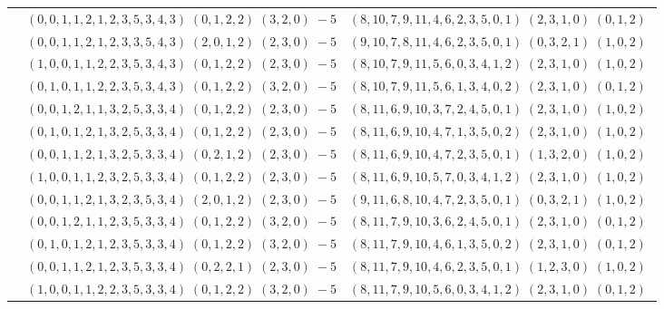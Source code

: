 \documentclass[11pt]{article}
\begin{document}
\begin{longtable}[l]{|c|c|c|}
 \cline{2-3} 
 & $(0 ,0 ,1 ,1 ,2 ,1 ,2 ,3 ,5 ,3 ,4 ,3) \;(0 ,1 ,2 ,2) \;(3 ,2 ,0) \;-5$ & $(8 ,10 ,7 ,9 ,11 ,4 ,6 ,2 ,3 ,5 ,0 ,1) \;(2 ,3 ,1 ,0) \;(0 ,1 ,2) \;$\\ 
 \cline{2-3} 
 & $(0 ,0 ,1 ,1 ,2 ,1 ,2 ,3 ,3 ,5 ,4 ,3) \;(2 ,0 ,1 ,2) \;(2 ,3 ,0) \;-5$ & $(9 ,10 ,7 ,8 ,11 ,4 ,6 ,2 ,3 ,5 ,0 ,1) \;(0 ,3 ,2 ,1) \;(1 ,0 ,2) \;$\\ 
 \cline{2-3} 
 & $(1 ,0 ,0 ,1 ,1 ,2 ,2 ,3 ,5 ,3 ,4 ,3) \;(0 ,1 ,2 ,2) \;(2 ,3 ,0) \;-5$ & $(8 ,10 ,7 ,9 ,11 ,5 ,6 ,0 ,3 ,4 ,1 ,2) \;(2 ,3 ,1 ,0) \;(1 ,0 ,2) \;$\\ 
 \cline{2-3} 
 & $(0 ,1 ,0 ,1 ,1 ,2 ,2 ,3 ,5 ,3 ,4 ,3) \;(0 ,1 ,2 ,2) \;(3 ,2 ,0) \;-5$ & $(8 ,10 ,7 ,9 ,11 ,5 ,6 ,1 ,3 ,4 ,0 ,2) \;(2 ,3 ,1 ,0) \;(0 ,1 ,2) \;$\\ 
 \cline{2-3} 
 & $(0 ,0 ,1 ,2 ,1 ,1 ,3 ,2 ,5 ,3 ,3 ,4) \;(0 ,1 ,2 ,2) \;(2 ,3 ,0) \;-5$ & $(8 ,11 ,6 ,9 ,10 ,3 ,7 ,2 ,4 ,5 ,0 ,1) \;(2 ,3 ,1 ,0) \;(1 ,0 ,2) \;$\\ 
 \cline{2-3} 
 & $(0 ,1 ,0 ,1 ,2 ,1 ,3 ,2 ,5 ,3 ,3 ,4) \;(0 ,1 ,2 ,2) \;(2 ,3 ,0) \;-5$ & $(8 ,11 ,6 ,9 ,10 ,4 ,7 ,1 ,3 ,5 ,0 ,2) \;(2 ,3 ,1 ,0) \;(1 ,0 ,2) \;$\\ 
 \cline{2-3} 
 & $(0 ,0 ,1 ,1 ,2 ,1 ,3 ,2 ,5 ,3 ,3 ,4) \;(0 ,2 ,1 ,2) \;(2 ,3 ,0) \;-5$ & $(8 ,11 ,6 ,9 ,10 ,4 ,7 ,2 ,3 ,5 ,0 ,1) \;(1 ,3 ,2 ,0) \;(1 ,0 ,2) \;$\\ 
 \cline{2-3} 
 & $(1 ,0 ,0 ,1 ,1 ,2 ,3 ,2 ,5 ,3 ,3 ,4) \;(0 ,1 ,2 ,2) \;(2 ,3 ,0) \;-5$ & $(8 ,11 ,6 ,9 ,10 ,5 ,7 ,0 ,3 ,4 ,1 ,2) \;(2 ,3 ,1 ,0) \;(1 ,0 ,2) \;$\\ 
 \cline{2-3} 
 & $(0 ,0 ,1 ,1 ,2 ,1 ,3 ,2 ,3 ,5 ,3 ,4) \;(2 ,0 ,1 ,2) \;(2 ,3 ,0) \;-5$ & $(9 ,11 ,6 ,8 ,10 ,4 ,7 ,2 ,3 ,5 ,0 ,1) \;(0 ,3 ,2 ,1) \;(1 ,0 ,2) \;$\\ 
 \cline{2-3} 
 & $(0 ,0 ,1 ,2 ,1 ,1 ,2 ,3 ,5 ,3 ,3 ,4) \;(0 ,1 ,2 ,2) \;(3 ,2 ,0) \;-5$ & $(8 ,11 ,7 ,9 ,10 ,3 ,6 ,2 ,4 ,5 ,0 ,1) \;(2 ,3 ,1 ,0) \;(0 ,1 ,2) \;$\\ 
 \cline{2-3} 
 & $(0 ,1 ,0 ,1 ,2 ,1 ,2 ,3 ,5 ,3 ,3 ,4) \;(0 ,1 ,2 ,2) \;(3 ,2 ,0) \;-5$ & $(8 ,11 ,7 ,9 ,10 ,4 ,6 ,1 ,3 ,5 ,0 ,2) \;(2 ,3 ,1 ,0) \;(0 ,1 ,2) \;$\\ 
 \cline{2-3} 
 & $(0 ,0 ,1 ,1 ,2 ,1 ,2 ,3 ,5 ,3 ,3 ,4) \;(0 ,2 ,2 ,1) \;(2 ,3 ,0) \;-5$ & $(8 ,11 ,7 ,9 ,10 ,4 ,6 ,2 ,3 ,5 ,0 ,1) \;(1 ,2 ,3 ,0) \;(1 ,0 ,2) \;$\\ 
 \cline{2-3} 
 & $(1 ,0 ,0 ,1 ,1 ,2 ,2 ,3 ,5 ,3 ,3 ,4) \;(0 ,1 ,2 ,2) \;(3 ,2 ,0) \;-5$ & $(8 ,11 ,7 ,9 ,10 ,5 ,6 ,0 ,3 ,4 ,1 ,2) \;(2 ,3 ,1 ,0) \;(0 ,1 ,2) \;$\\ 

\end{longtable}
\end{document}
